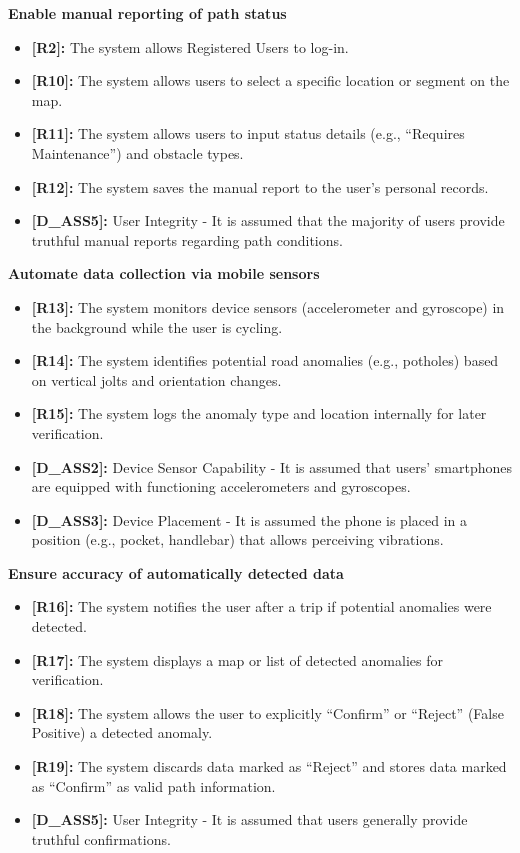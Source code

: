\begin{enumerate}[label=\textbf{-[G\arabic*]}:]
    \item \textbf{Enable manual reporting of path status}
    \begin{itemize}
        \item \textbf{[R2]:} The system allows Registered Users to log-in.
        \item \textbf{[R10]:} The system allows users to select a specific location or segment on the map.
        \item \textbf{[R11]:} The system allows users to input status details (e.g., ``Requires Maintenance'') and obstacle types.
        \item \textbf{[R12]:} The system saves the manual report to the user's personal records.
        \item \textbf{[D\_ASS5]:} User Integrity - It is assumed that the majority of users provide truthful manual reports regarding path conditions.
    \end{itemize}

    \item \textbf{Automate data collection via mobile sensors}
    \begin{itemize}
        \item \textbf{[R13]:} The system monitors device sensors (accelerometer and gyroscope) in the background while the user is cycling.
        \item \textbf{[R14]:} The system identifies potential road anomalies (e.g., potholes) based on vertical jolts and orientation changes.
        \item \textbf{[R15]:} The system logs the anomaly type and location internally for later verification.
        \item \textbf{[D\_ASS2]:} Device Sensor Capability - It is assumed that users' smartphones are equipped with functioning accelerometers and gyroscopes.
        \item \textbf{[D\_ASS3]:} Device Placement - It is assumed the phone is placed in a position (e.g., pocket, handlebar) that allows perceiving vibrations.
    \end{itemize}

    \item \textbf{Ensure accuracy of automatically detected data}
    \begin{itemize}
        \item \textbf{[R16]:} The system notifies the user after a trip if potential anomalies were detected.
        \item \textbf{[R17]:} The system displays a map or list of detected anomalies for verification.
        \item \textbf{[R18]:} The system allows the user to explicitly ``Confirm'' or ``Reject'' (False Positive) a detected anomaly.
        \item \textbf{[R19]:} The system discards data marked as ``Reject'' and stores data marked as ``Confirm'' as valid path information.
        \item \textbf{[D\_ASS5]:} User Integrity - It is assumed that users generally provide truthful confirmations.
    \end{itemize}


\end{enumerate}
